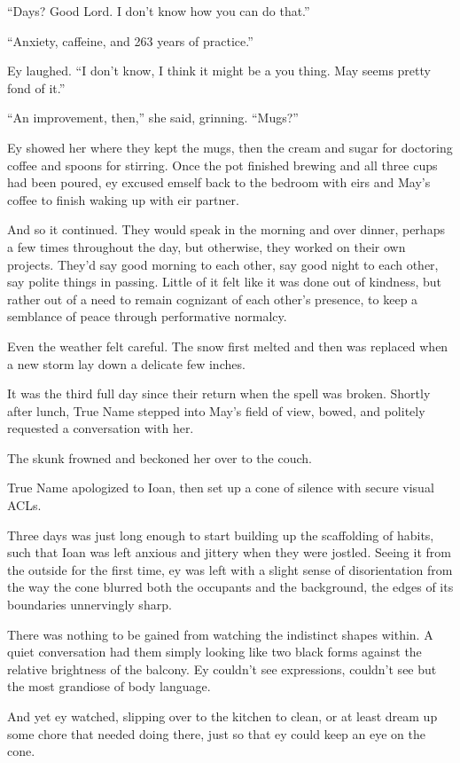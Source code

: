 ``Days? Good Lord. I don't know how you can do that.''

``Anxiety, caffeine, and 263 years of practice.''

Ey laughed. ``I don't know, I think it might be a you thing. May seems pretty fond of it.''

``An improvement, then,'' she said, grinning. ``Mugs?''

Ey showed her where they kept the mugs, then the cream and sugar for doctoring coffee and spoons for stirring. Once the pot finished brewing and all three cups had been poured, ey excused emself back to the bedroom with eirs and May's coffee to finish waking up with eir partner.

And so it continued. They would speak in the morning and over dinner, perhaps a few times throughout the day, but otherwise, they worked on their own projects. They'd say good morning to each other, say good night to each other, say polite things in passing. Little of it felt like it was done out of kindness, but rather out of a need to remain cognizant of each other's presence, to keep a semblance of peace through performative normalcy.

Even the weather felt careful. The snow first melted and then was replaced when a new storm lay down a delicate few inches.

It was the third full day since their return when the spell was broken. Shortly after lunch, True Name stepped into May's field of view, bowed, and politely requested a conversation with her.

The skunk frowned and beckoned her over to the couch.

True Name apologized to Ioan, then set up a cone of silence with secure visual ACLs.

Three days was just long enough to start building up the scaffolding of habits, such that Ioan was left anxious and jittery when they were jostled. Seeing it from the outside for the first time, ey was left with a slight sense of disorientation from the way the cone blurred both the occupants and the background, the edges of its boundaries unnervingly sharp.

There was nothing to be gained from watching the indistinct shapes within. A quiet conversation had them simply looking like two black forms against the relative brightness of the balcony. Ey couldn't see expressions, couldn't see but the most grandiose of body language.

And yet ey watched, slipping over to the kitchen to clean, or at least dream up some chore that needed doing there, just so that ey could keep an eye on the cone.

